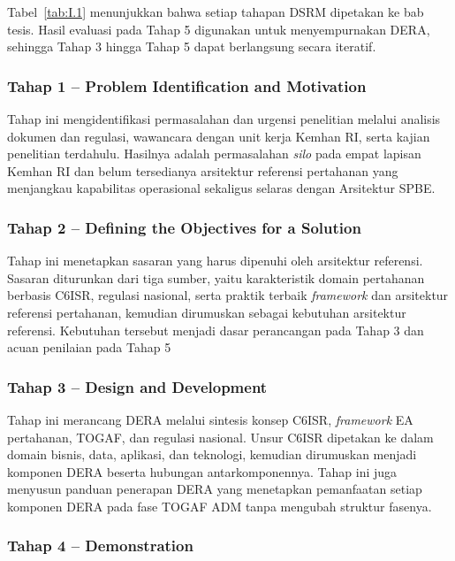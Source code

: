 Tabel~\ref{tab:I.1} menunjukkan bahwa setiap tahapan DSRM dipetakan ke bab tesis. Hasil evaluasi pada Tahap 5 digunakan untuk menyempurnakan DERA, sehingga Tahap 3 hingga Tahap 5 dapat berlangsung secara iteratif.

\subsubsection{Tahap 1 – Problem Identification and Motivation}
\label{sec:I.7.2.1}

Tahap ini mengidentifikasi permasalahan dan urgensi penelitian melalui analisis dokumen dan regulasi, wawancara dengan unit kerja Kemhan RI, serta kajian penelitian terdahulu. Hasilnya adalah permasalahan \textit{silo} pada empat lapisan Kemhan RI dan belum tersedianya arsitektur referensi pertahanan yang menjangkau kapabilitas operasional sekaligus selaras dengan Arsitektur SPBE.

\subsubsection{Tahap 2 – Defining the Objectives for a Solution}
\label{sec:I.7.2.2}

Tahap ini menetapkan sasaran yang harus dipenuhi oleh arsitektur referensi. Sasaran diturunkan dari tiga sumber, yaitu karakteristik domain pertahanan berbasis C6ISR, regulasi nasional, serta praktik terbaik \textit{framework} dan arsitektur referensi pertahanan, kemudian dirumuskan sebagai kebutuhan arsitektur referensi. Kebutuhan tersebut menjadi dasar perancangan pada Tahap 3 dan acuan penilaian pada Tahap 5

\subsubsection{Tahap 3 – Design and Development}
\label{sec:I.7.2.3}

Tahap ini merancang DERA melalui sintesis konsep C6ISR, \textit{framework} EA pertahanan, TOGAF, dan regulasi nasional. Unsur C6ISR dipetakan ke dalam domain bisnis, data, aplikasi, dan teknologi, kemudian dirumuskan menjadi komponen DERA beserta hubungan antarkomponennya. Tahap ini juga menyusun panduan penerapan DERA yang menetapkan pemanfaatan setiap komponen DERA pada fase TOGAF ADM tanpa mengubah struktur fasenya.

\subsubsection{Tahap 4 – Demonstration}
\label{sec:I.7.2.4}


